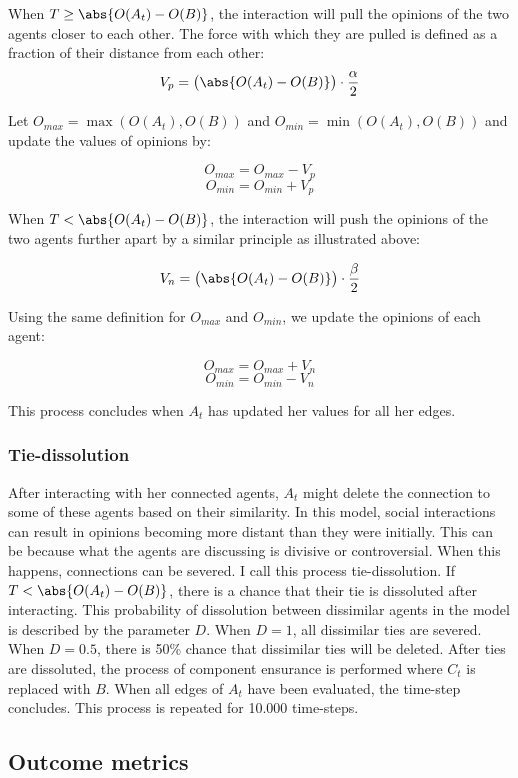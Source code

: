 \documentclass{article}
\DeclarePairedDelimiter{\abs}\lvert\rvert
\begin{document}
When $T \geq \abs{O(A_t) - O(B)}$, the interaction will pull the opinions of the two agents closer to each other. The force with which they are pulled is defined as a fraction of their distance from each other:
$$V_p = \big(\abs{O(A_t) - O(B)}\big) \cdot \frac{\alpha}{2}$$

Let $O_{max} = \max(O(A_t), O(B))$ and $O_{min} = \min(O(A_t), O(B))$ and update the values of opinions by:

$$O_{max} = O_{max} - V_p$$
$$O_{min} = O_{min} + V_p$$

When $T < \abs{O(A_t) - O(B)}$, the interaction will push the opinions of the two agents further apart by a similar principle as illustrated above: 

$$V_n = \big(\abs{O(A_t) - O(B)}\big) \cdot \frac{\beta}{2}$$

Using the same definition for $O_{max}$ and $O_{min}$, we update the opinions of each agent:

$$O_{max} = O_{max} + V_n$$
$$O_{min} = O_{min} - V_n$$

This process concludes when $A_t$ has updated her values for all her edges.

\subsubsection{Tie-dissolution}
After interacting with her connected agents, $A_t$ might delete the connection to some of these agents based on their similarity.
In this model, social interactions can result in opinions becoming more distant than they were initially. 
This can be because what the agents are discussing is divisive or controversial. When this happens, connections can be severed.
I call this process tie-dissolution. 
If $T < \abs{O(A_t) - O(B)}$, there is a chance that their tie is dissoluted after interacting. This probability of dissolution between dissimilar agents in the model is described by the parameter $D$.
When $D = 1$, all dissimilar ties are severed. When $D = 0.5$, there is 50\% chance that dissimilar ties will be deleted. 
After ties are dissoluted, the process of component ensurance is performed where $C_t$ is replaced with $B$.
When all edges of $A_t$ have been evaluated, the time-step concludes. This process is repeated for 10.000 time-steps.

\subsection{Outcome metrics} 
\end{document}
